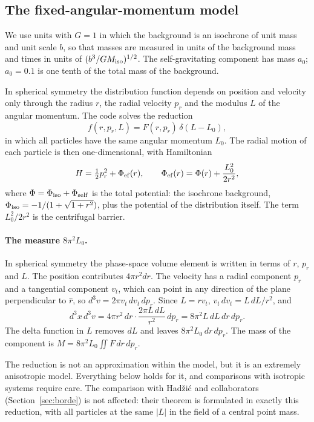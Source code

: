 \documentclass[11pt,a4paper]{article}
\begin{document}
\subsection{The fixed-angular-momentum model}
\label{sec:modelo}
\label{sec:reduccion}

We use units with $G=1$ in which the background is an isochrone of unit mass and unit
scale $b$, so that masses are measured in units of the background mass and times in
units of $(b^3/GM_{\rm iso})^{1/2}$. The self-gravitating component has mass $a_0$;
$a_0=0.1$ is one tenth of the total mass of the background.

In spherical symmetry the distribution function depends on position and velocity only
through the radius $r$, the radial velocity $p_r$ and the modulus $L$ of the angular
momentum. The code solves the reduction
\[
  f(r,p_r,L) = F(r,p_r)\,\delta(L-L_0),
\]
in which all particles have the same angular momentum $L_0$. The radial motion of each
particle is then one-dimensional, with Hamiltonian
\[
  H = \tfrac12 p_r^2 + \Phi_{\rm ef}(r), \qquad
  \Phi_{\rm ef}(r) = \Phi(r) + \frac{L_0^2}{2r^2},
\]
where $\Phi = \Phi_{\rm iso} + \Phi_{\rm self}$ is the total potential: the isochrone
background, $\Phi_{\rm iso} = -1/(1+\sqrt{1+r^2})$, plus the potential of the
distribution itself. The term $L_0^2/2r^2$ is the centrifugal barrier.

\paragraph{The measure $8\pi^2L_0$.} In spherical symmetry the phase-space volume
element is written in terms of $r$, $p_r$ and $L$. The position contributes
$4\pi r^2dr$. The velocity has a radial component $p_r$ and a tangential component
$v_t$, which can point in any direction of the plane perpendicular to $\hat r$, so
$d^3v=2\pi v_t\,dv_t\,dp_r$. Since $L=rv_t$, $v_t\,dv_t=L\,dL/r^2$, and
\[
  d^3x\,d^3v = 4\pi r^2\,dr\cdot\frac{2\pi L\,dL}{r^2}\,dp_r = 8\pi^2L\,dL\,dr\,dp_r .
\]
The delta function in $L$ removes $dL$ and leaves $8\pi^2L_0\,dr\,dp_r$. The mass of the
component is $M=8\pi^2L_0\iint F\,dr\,dp_r$.

The reduction is not an approximation within the model, but it is an extremely
anisotropic model. Everything below holds for it, and comparisons with isotropic
systems require care. The comparison with Hadžić and collaborators
(Section~\ref{sec:borde}) is not affected: their theorem is formulated in exactly this
reduction, with all particles at the same $|L|$ in the field of a central point mass.
\end{document}
